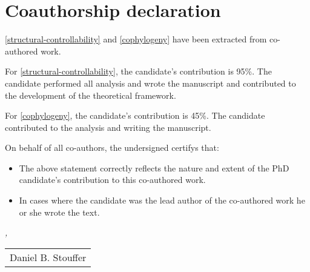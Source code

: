 
{}
\chapter*{Coauthorship declaration}
\thispagestyle{empty}

\begin{refsection}
\autoref{structural-controllability} \autocites{cagua_keystoneness_2019} and \autoref{cophylogeny} \autocites{hutchinson_cophylogenetic_2017} have been extracted from co-authored work.

\printbibliography[heading=none]

For \autoref{structural-controllability}, the candidate's contribution is 95\%. The candidate performed all analysis and wrote the manuscript and contributed to the development of the theoretical framework.

For \autoref{cophylogeny}, the candidate's contribution is 45\%. The candidate contributed to the analysis and writing the manuscript.

\end{refsection}

On behalf of all co-authors, the undersigned certifys that:

\begin{itemize}
	\item The above statement correctly reflects the nature and extent of the PhD candidate's
    contribution to this co-authored work.
	\item In cases where the candidate was the lead author of the co-authored work he or she
    wrote the text.
\end{itemize}

\bigskip

\noindent\textit{\myLocation, \myTime}

\smallskip

\begin{flushright}
    \begin{tabular}{m{5cm}}
        \\ \hline
        \centering Daniel B. Stouffer \\
    \end{tabular}
\end{flushright}
